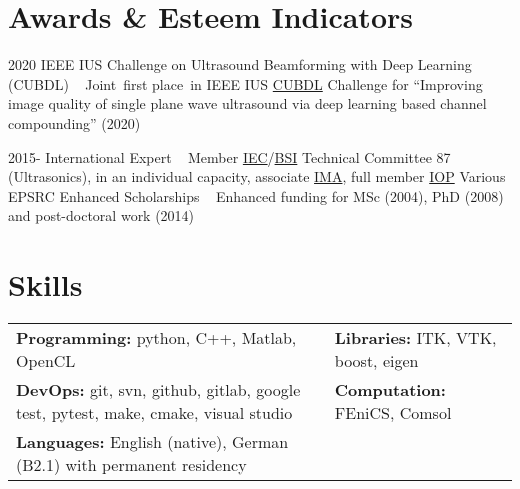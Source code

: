 \documentclass[english, print]{cv-style-wide}
\begin{document}
\section{Awards \& Esteem Indicators}
\vspace{-0.2cm}
\begin{entrylist}
\entry
{2020}
{IEEE IUS Challenge on Ultrasound Beamforming with Deep Learning (CUBDL)}
{~}
{Joint~first place~in IEEE IUS \href{https://cubdl.jhu.edu/}{CUBDL} Challenge for \enquote{Improving image quality of single plane wave ultrasound via deep learning based channel compounding} (2020) }

\entry
{2015-}
{International Expert}
{~}
{Member \href{https://iec.ch/dyn/www/f?p=103:7:::::FSP_ORG_ID:1281}{IEC}/\href{https://standardsdevelopment.bsigroup.com/committees/50001534}{BSI} Technical Committee 87 (Ultrasonics), in an individual capacity, associate \href{https://ima.org.uk/}{IMA}, full member \href{https://www.iop.org/}{IOP}}
%
%
%
\entry
{Various}
{EPSRC Enhanced Scholarships}
{~}
{Enhanced funding for MSc (2004), PhD (2008) and post-doctoral work (2014)}
\end{entrylist}


\section{Skills}
  \vspace{-0.2cm}
\begin{tabular}{p{} p{} }
\textbf{Programming:} python, C++, Matlab, OpenCL & \textbf{Libraries:} ITK, VTK, boost, eigen \\
%
\textbf{DevOps:} git, svn, github, gitlab, google test, pytest, make, cmake, visual studio & \textbf{Computation:} FEniCS, Comsol \\
%
%
 \textbf{Languages:} English (native), German (B2.1) with permanent residency  & {}
\end{tabular}
\end{document}
